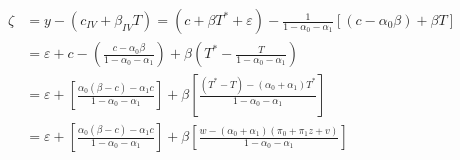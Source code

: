 \documentclass[12pt]{article}
\begin{document}
\begin{align*}
  \zeta &= y - (c_{IV} + \beta_{IV} T) = (c + \beta T^* + \varepsilon) - \frac{1}{1 - \alpha_0 - \alpha_1}\left[ \left(c - \alpha_0 \beta\right) + \beta T \right] \\
  &= \varepsilon + c - \left(\frac{c - \alpha_0 \beta}{1 - \alpha_0 - \alpha_1} \right) + \beta\left( T^* - \frac{T}{1 - \alpha_0 - \alpha_1} \right)\\
  &= \varepsilon + \left[\frac{\alpha_0 (\beta - c) - \alpha_1 c}{1 - \alpha_0 - \alpha_1} \right] + \beta\left[ \frac{(T^* - T) - (\alpha_0 + \alpha_1)T^*}{1 - \alpha_0 - \alpha_1} \right]\\
  &= \varepsilon + \left[\frac{\alpha_0 (\beta - c) - \alpha_1 c}{1 - \alpha_0 - \alpha_1} \right] + \beta\left[ \frac{w - (\alpha_0 + \alpha_1)(\pi_0 + \pi_1 z + v)}{1 - \alpha_0 - \alpha_1} \right]
\end{align*}

\end{document}
